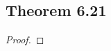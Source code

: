 \documentclass[../../main.tex]{subfiles}
\begin{document}
\subsection{Theorem 6.21}
\begin{wts}

\end{wts}
\begin{proof}

\end{proof}
\end{document}
